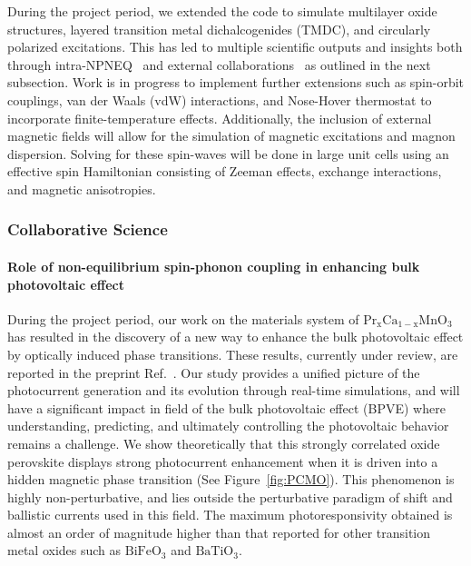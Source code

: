 During the project period, we extended the code to simulate multilayer oxide structures, layered transition metal dichalcogenides (TMDC), and circularly polarized excitations. 
This has led to multiple scientific outputs and insights both through intra-NPNEQ~\cite{Rajpurohit2021} and external collaborations~\cite{Siddiqui2020} as outlined in the next subsection. 
Work is in progress to implement further extensions such as spin-orbit couplings, van der Waals (vdW) interactions, and Nose-Hover thermostat to incorporate finite-temperature effects. 
Additionally, the inclusion of external magnetic fields will allow for the simulation of magnetic excitations and magnon dispersion. 
Solving for these spin-waves will be done in large unit cells using an effective spin Hamiltonian consisting of Zeeman effects, exchange interactions, and magnetic
anisotropies. 

\subsubsection{Collaborative Science}
\label{sec:collaborative}

\paragraph{Role of non-equilibrium spin-phonon coupling in enhancing bulk photovoltaic effect}\label{sec:BPVE}

During the project period, our work on the materials system of \(\mathrm{Pr_xCa_{1-x}MnO_3}\) has resulted in the discovery of a new way to enhance the bulk photovoltaic effect by optically induced phase transitions. 
These results, currently under review, are reported in the preprint Ref.~\cite{Rajpurohit2021}. 
Our study provides a unified picture of the photocurrent generation and its evolution through real-time simulations, and will have a significant impact in field of the bulk photovoltaic effect (BPVE) where understanding, predicting, and ultimately controlling the photovoltaic behavior remains a challenge.
We show theoretically that this strongly correlated oxide perovskite displays strong photocurrent enhancement when it is driven into a hidden magnetic phase transition (See Figure~\ref{fig:PCMO}).
This phenomenon is highly non-perturbative, and lies outside the perturbative paradigm of shift and ballistic currents used in this field. 
The maximum photoresponsivity obtained is almost an order of magnitude higher than that reported for other transition metal oxides such as \(\mathrm{BiFeO_3}\) and \(\mathrm{BaTiO_3}\).

